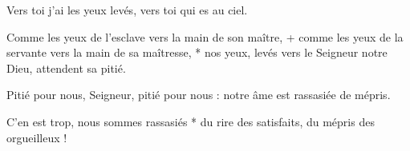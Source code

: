 \item Vers toi j'ai les yeux levés, vers toi qui es au ciel.

\item Comme les yeux de l'esclave vers la main de son maître, + comme les yeux de la servante vers la main de sa maîtresse, * nos yeux, levés vers le Seigneur notre Dieu, attendent sa pitié.

\item Pitié pour nous, Seigneur, pitié pour nous : notre âme est rassasiée de mépris.

\item C'en est trop, nous sommes rassasiés * du rire des satisfaits, du mépris des orgueilleux !